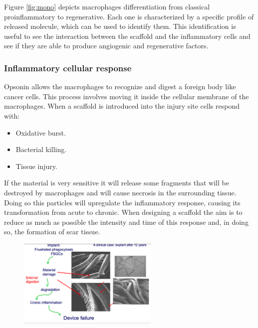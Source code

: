 		Figure \ref{fig:mono} depicts macrophages differentiation from classical proinflammatory to regenerative.
		Each one is characterized by a specific profile of released molecule, which can be used to identify them.
		This identification is useful to see the interaction between the scaffold and the inflammatory cells and see if they are able to produce angiogenic and regenerative factors.

		\subsubsection{Inflammatory cellular response}
		Opsonin allows the macrophages to recognize and digest a foreign body like cancer cells.
		This process involves moving it inside the cellular membrane of the macrophages.
		When a scaffold is introduced into the injury site cells respond with:

		\begin{multicols}{3}
			\begin{itemize}
				\item Oxidative burst.
				\item Bacterial killing.
				\item Tissue injury.
			\end{itemize}
		\end{multicols}

		If the material is very sensitive it will release some fragments that will be destroyed by macrophages and will cause necrosis in the surrounding tissue.
		Doing so this particles will upregulate the inflammatory response, causing its transformation from acute to chronic.
		When designing a scaffold the aim is to reduce as much as possible the intensity and time of this response and, in doing so, the formation of scar tissue.

		\begin{figure}[ht]
			\centering
			\includegraphics[width=0.6\textwidth]{failure}
			\caption{\label{fig:failure}}
		\end{figure}


